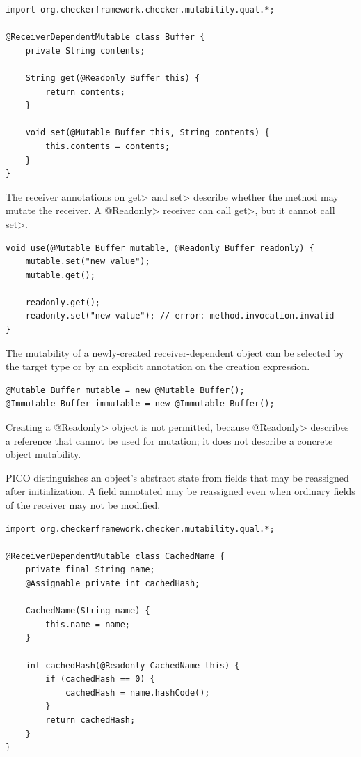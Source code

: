 \begin{Verbatim}
import org.checkerframework.checker.mutability.qual.*;

@ReceiverDependentMutable class Buffer {
    private String contents;

    String get(@Readonly Buffer this) {
        return contents;
    }

    void set(@Mutable Buffer this, String contents) {
        this.contents = contents;
    }
}
\end{Verbatim}

The receiver annotations on \<get> and \<set> describe whether the method
may mutate the receiver.  A \<@Readonly> receiver can call \<get>, but it
cannot call \<set>.

\begin{Verbatim}
void use(@Mutable Buffer mutable, @Readonly Buffer readonly) {
    mutable.set("new value");
    mutable.get();

    readonly.get();
    readonly.set("new value"); // error: method.invocation.invalid
}
\end{Verbatim}


The mutability of a newly-created receiver-dependent object can be selected
by the target type or by an explicit annotation on the creation expression.

\begin{Verbatim}
@Mutable Buffer mutable = new @Mutable Buffer();
@Immutable Buffer immutable = new @Immutable Buffer();
\end{Verbatim}

Creating a \<@Readonly> object is not permitted, because \<@Readonly>
describes a reference that cannot be used for mutation; it does not describe
a concrete object mutability.


PICO distinguishes an object's abstract state from fields that may be
reassigned after initialization.  A field annotated
 may be reassigned even when
ordinary fields of the receiver may not be modified.

\begin{Verbatim}
import org.checkerframework.checker.mutability.qual.*;

@ReceiverDependentMutable class CachedName {
    private final String name;
    @Assignable private int cachedHash;

    CachedName(String name) {
        this.name = name;
    }

    int cachedHash(@Readonly CachedName this) {
        if (cachedHash == 0) {
            cachedHash = name.hashCode();
        }
        return cachedHash;
    }
}
\end{Verbatim}

